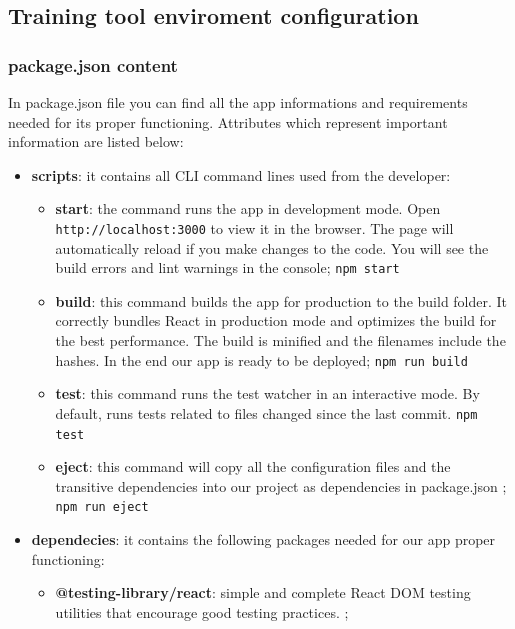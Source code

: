 	\subsection{Training tool enviroment configuration}
	
	
		\subsubsection{package.json content}
In package.json file you can find all the app informations and requirements needed for its proper functioning. Attributes which represent important information are listed below:
		\begin{itemize}
			\item\textbf{scripts}: it contains all CLI command lines used from the developer: 
				\begin{itemize}
				\item\textbf{start}: the command runs the app in development mode. Open \texttt{http://localhost:3000} to view it in the browser. The page will automatically reload if you make changes to the code. You will see the build errors and lint warnings in the console;
				\newline\texttt{npm start}
				\item\textbf{build}: this command builds the app for production to the build folder. It correctly bundles React in production mode and optimizes the build for the best performance. The build is minified and the filenames include the hashes. In the end our app is ready to be deployed;
				\newline\texttt{npm run build}
				\item\textbf{test}: this command runs the test watcher in an interactive mode. By default, runs tests related to files changed since the last commit.
				\newline\texttt{npm test}
				\item\textbf{eject}: this command will copy all the configuration files and the transitive dependencies into our project as dependencies in package.json ;
				\newline\texttt{npm run eject}
			\end{itemize}
			\item\textbf{dependecies}: it contains the following packages needed for our app proper functioning:
			\begin{itemize}
				\item\textbf{@testing-library/react}: simple and complete React DOM testing utilities that encourage good testing practices. ;

\end{itemize}
\end{itemize}
